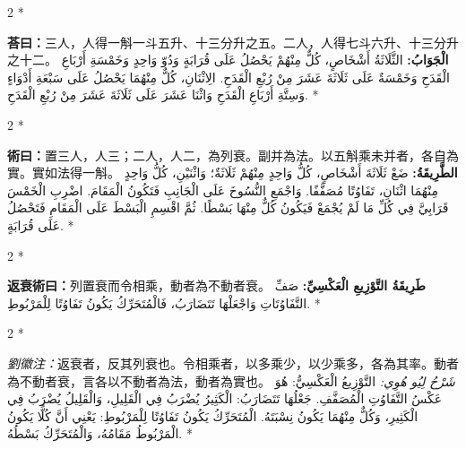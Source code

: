\documentclass[11pt,a4paper]{article}
\newcommand{\ar}[1]{\arabicfont\beginR #1\endR}
\newenvironment{bilingual}{%
  \begin{paracol}{2}%
  \switchcolumn[0]*%
}{%
  \end{paracol}%
}
\newcommand{\cnline}[1]{\switchcolumn[0]\noindent #1 \switchcolumn[1]}
\newcommand{\arline}[1]{\noindent\ar{#1} \switchcolumn[0]*}
\newenvironment{prob bilingual}{%
  \begin{paracol}{2}%
  \switchcolumn[0]*%
}{%
  \end{paracol}%
  \vspace{0.3em}%
}
\begin{document}
\begin{bilingual}
\cnline{\textcolor{answercolor}{\textbf{荅曰：}}三人，人得一斛一斗五升、十三分升之五。二人，人得七斗六升、十三分升之十二。}
\arline{\textcolor{answercolor}{\textbf{الْجَوَابُ:}} الثَّلَاثَةُ أَشْخَاصٍ، كُلٌّ مِنْهُمْ يَحْصُلُ عَلَى قُرَابَةٍ وَدُوّ وَاحِدٍ وَخَمْسَةِ أَرْبَاعِ الْقَدَحِ وَخَمْسَةٌ عَلَى ثَلَاثَةَ عَشَرَ مِنْ رُبْعِ الْقَدَحِ. الِاثْنَانِ، كُلٌّ مِنْهُمَا يَحْصُلُ عَلَى سَبْعَةِ أَدْوَاءٍ وَسِتَّةِ أَرْبَاعِ الْقَدَحِ وَاثْنَا عَشَرَ عَلَى ثَلَاثَةَ عَشَرَ مِنْ رُبْعِ الْقَدَحِ.}
\end{bilingual}

\begin{bilingual}
\cnline{%
\textcolor{methodcolor}{\textbf{術曰：}}置三人，人三；二人，人二，為列衰。副并為法。以五斛乘未并者，各自為實。實如法得一斛。
}
\arline{%
\textcolor{methodcolor}{\textbf{الطَّرِيقَةُ:}} ضَعْ ثَلَاثَةَ أَشْخَاصٍ، كُلُّ وَاحِدٍ مِنْهُمْ ثَلَاثَةٌ؛ وَاثْنَيْنِ، كُلُّ وَاحِدٍ مِنْهُمَا اثْنَانِ، تَفَاوُتًا مُصَفَّفًا. وَاجْمَعِ النُّسُوخَ عَلَى الْجَانِبِ فَتَكُونُ الْمَقَامَ. اضْرِبِ الْخَمْسَ قَرَابِيَّ فِي كُلِّ مَا لَمْ يُجْمَعْ فَيَكُونُ كُلٌّ مِنْهَا بَسْطًا. ثُمَّ اقْسِمِ الْبَسْطَ عَلَى الْمَقَامِ فَتَحْصُلُ عَلَى قُرَابَةٍ.
}
\end{bilingual}

\vspace{0.5em}

\begin{bilingual}
\cnline{%
\textcolor{methodcolor}{\textbf{返衰術曰：}}列置衰而令相乘，動者為不動者衰。
}
\arline{%
\textcolor{methodcolor}{\textbf{طَرِيقَةُ التَّوْزِيعِ الْعَكْسِيِّ:}} صَفِّ التَّفَاوُتَاتِ وَاجْعَلْهَا تَتَضَارَبُ، فَالْمُتَحَرِّكُ يَكُونُ تَفَاوُتًا لِلْمَرْبُوطِ.
}
\end{bilingual}

\begin{bilingual}
\cnline{%
\textcolor{commentarycolor}{\small\textit{劉徽注：}}返衰者，反其列衰也。令相乘者，以多乘少，以少乘多，各為其率。動者為不動者衰，言各以不動者為法，動者為實也。
}
\arline{%
\textcolor{commentarycolor}{\small\textit{شَرْحُ لِيُو هُوِي:}} التَّوْزِيعُ الْعَكْسِيُّ: هُوَ عَكْسُ التَّفَاوُتِ الْمُصَفَّفِ. جَعْلُهَا تَتَضَارَبُ: الْكَثِيرُ يُضْرَبُ فِي الْقَلِيلِ، وَالْقَلِيلُ يُضْرَبُ فِي الْكَثِيرِ، وَكُلٌّ مِنْهُمَا يَكُونُ نِسْبَتَهُ. الْمُتَحَرِّكُ يَكُونُ تَفَاوُتًا لِلْمَرْبُوطِ: يَعْنِي أَنَّ كُلًّا يَكُونُ الْمَرْبُوطُ مَقَامُهُ، وَالْمُتَحَرِّكُ بَسْطُهُ.
}
\end{bilingual}
\end{document}
